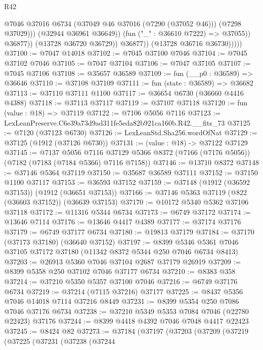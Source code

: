 \begin{lexlean}{R42}
\begin{coremodule}
{                              @7046
                              @37016
                              @6734
                              (@37049 @46 @37016 (@7290 (@37052 @46)))
                              (@7298 @37029)))
                          (@32944 @36961 @36649))
                        (fun ("_" : @36610 @7222) => @37055))
                      @36877))
                  (@13728 @36720 @36729))
                @36877))
            (@13728 @36716 @36730)))))
@37100 := @7047 @14018
@37102 := @7045 @37100 @7046
@37104 := @7045 @37102 @7046
@37105 := @7047 @37104
@37106 := @7047 @37105
@37107 := @7045 @37106
@37108 := @35657 @36589
@37109 := fun (__p0 : @36589) => @36646
@37110 := @37108 @37109
@37111 := fun (state : @36589) => @36682
@37113 := @37110 @37111 @1100
@37117 := @36654 @6730 (@36660 @4416 @4388)
@37118 := @37113 @37117
@37119 := @37107 @37118
@37120 := fun (value : @18) => @37119
@37122 := @7106 @5056 @7116
@37123 := LexLeanPreserve.C6e39a73d9ad311fe5eda82b921ca160b.R42.__fits_73
@37125 := @7120 (@37123 @6730)
@37126 := LexLeanStd.Sha256.wordOfNat
@37129 := @37125 (@1912 (@37126 @6730))
@37131 := (value : @18) -> @37122 @37129
@37145 := @7137
    @5056
    @7116
    @37129
    @5366
    @8372
    (@7166 (@7176 @5056))
    (@7182 (@7183 (@7184 @5366) @7116 @7158))
@37146 := @13710 @8372
@37148 := @37146 @5364 @37119
@37150 := @35687 @36589 @37111
@37152 := @37150 @1100 @37117
@37153 := @36593 @37152
@37159 := @37148 (@1912 (@36592 @37153)) (@1912 (@36651 @37153))
@37166 := @37146 @5363 @37119 (@822 (@36603 @37152)) (@36639 @37153)
@37170 := @10172 @5340 @5362 @37106 @37118
@37172 := @11316 @5344 @6734
@37173 := @6749 @37172
@37174 := @13646 @7114
@37176 := @13646 @4417 @4389
@37177 := @37174 @37176
@37179 := @6749 @37177 @6734
@37180 := @19813 @37179
@37184 := @37170 (@37173 @37180) (@36640 @37152)
@37197 := @8399 @5346 @5361 @7046 @37105 @37172 @37180 (@11342 @8372 @5344 @250 @7046 @6734 @8413)
@37203 := @26913 @5360 @7046 @37104 @2687 @37179 @26919
@37209 := @8399 @5358 @250 @37102 @7046 @37177 @6734
@37210 := @8383 @358
@37214 := @37210 @5350 @5357 @37100 @7046
@37216 := @6749 @37176 @6734
@37219 := @37214 (@7115 @37216) @37177
@37225 := @8437 @5356 @7046 @14018 @7114 @37216 @8449
@37231 := @8399 @5354 @250 @7086 @7046 @37176 @6734
@37238 := @37210 @5349 @5353 @7084 @7046 (@22780 @22423) @37176
@37244 := @8399 @4418 @4392 @7046 @7048 @4417 @22423
@37245 := @8424 @82
@37273 := @37184
    (@37197
      (@37203
        (@37209
          (@37219
            (@37225
              (@37231
                (@37238
                  (@37244
}
\end{coremodule}
\end{lexlean}
